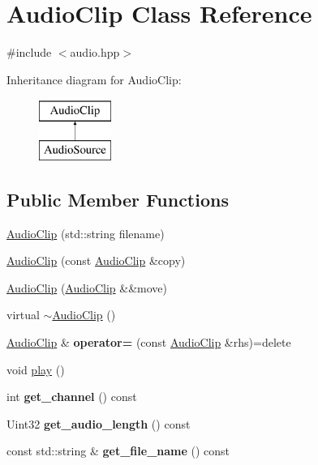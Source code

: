 \hypertarget{class_audio_clip}{}\section{Audio\+Clip Class Reference}
\label{class_audio_clip}


{\ttfamily \#include $<$audio.\+hpp$>$}

Inheritance diagram for Audio\+Clip\+:\begin{figure}[H]
\begin{center}
\leavevmode
\includegraphics[height=2.000000cm]{class_audio_clip}
\end{center}
\end{figure}
\subsection*{Public Member Functions}
\begin{DoxyCompactItemize}
\item 
\mbox{\hyperlink{class_audio_clip_a92cb3dceab020f54290b05b1ae5de974}{Audio\+Clip}} (std\+::string filename)
\item 
\mbox{\hyperlink{class_audio_clip_ac5664fc84d17e5e31c1daacdec89b3cf}{Audio\+Clip}} (const \mbox{\hyperlink{class_audio_clip}{Audio\+Clip}} \&copy)
\item 
\mbox{\hyperlink{class_audio_clip_a0a4d351823548e0f54625c37db221c82}{Audio\+Clip}} (\mbox{\hyperlink{class_audio_clip}{Audio\+Clip}} \&\&move)
\item 
virtual \mbox{\hyperlink{class_audio_clip_ab929796e463c51c50f2ad4e9acec35da}{$\sim$\+Audio\+Clip}} ()
\item 
\mbox{\label{class_audio_clip_ac1466d6ec65150fa8beb08611cda995c}} 
\mbox{\hyperlink{class_audio_clip}{Audio\+Clip}} \& {\bfseries operator=} (const \mbox{\hyperlink{class_audio_clip}{Audio\+Clip}} \&rhs)=delete
\item 
void \mbox{\hyperlink{class_audio_clip_a615c3e8e6da9cdf8b98c1682135c2a75}{play}} ()
\item 
\mbox{\label{class_audio_clip_a86486cb3622e9056d4d5f580889f9f16}} 
int {\bfseries get\+\_\+channel} () const
\item 
\mbox{\label{class_audio_clip_ae4ff05317126ce507a64c836f524ca4f}} 
Uint32 {\bfseries get\+\_\+audio\+\_\+length} () const
\item 
\mbox{\label{class_audio_clip_aadb9a7b1a085647f61f0120953734ca0}} 
const std\+::string \& {\bfseries get\+\_\+file\+\_\+name} () const
\end{DoxyCompactItemize}


